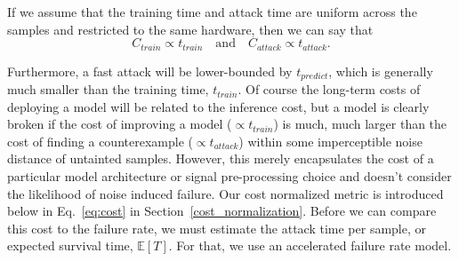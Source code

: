 If we assume that the training time and attack time are uniform across the samples and restricted to the same hardware, then we can say that
\begin{equation}
C_{train} \propto t_{train} \text{~~~and~~~} C_{attack} \propto t_{attack}.
\label{eq:naive_cost}
\end{equation}

Furthermore, a fast attack will be lower-bounded by $t_{predict}$, which is generally much smaller than the training time, $t_{train}$. Of course the long-term costs of deploying a model will be related to the inference cost, but a model is clearly broken if the cost of improving a model ($\propto t_{train}$) is much, much larger than the cost of finding a counterexample ($\propto t_{attack}$) within some imperceptible noise distance of untainted samples. However, this merely encapsulates the cost of a particular model architecture or signal pre-processing choice and doesn't consider the likelihood of noise induced failure. Our cost normalized metric is introduced below in Eq.~\ref{eq:cost} in Section~\ref{cost_normalization}. Before we can compare this cost to the failure rate, we must estimate the attack time per sample, or expected survival time, $\mathbb{E}[T]$. For that, we use an accelerated failure rate model.








